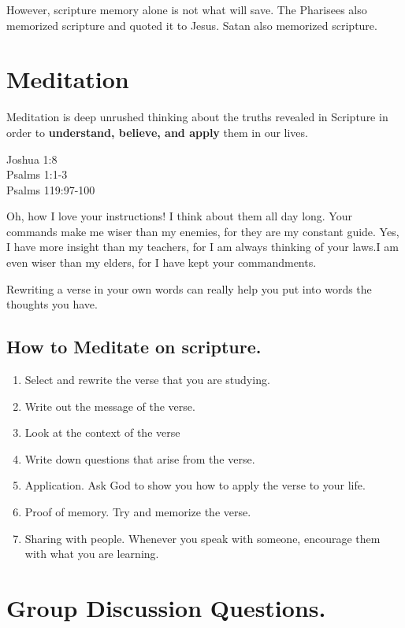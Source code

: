 \documentclass[
  letterpaper,
  DIV=11,
  numbers=noendperiod]{scrartcl}
\providecommand{\tightlist}{%
  \setlength{\itemsep}{0pt}\setlength{\parskip}{0pt}}
\begin{document}
However, scripture memory alone is not what will save. The Pharisees
also memorized scripture and quoted it to Jesus. Satan also memorized
scripture.


\chapter{Meditation}\label{meditation}

Meditation is deep unrushed thinking about the truths revealed in
Scripture in order to \textbf{understand, believe, and apply} them in
our lives.

Joshua 1:8\\
Psalms 1:1-3\\
Psalms 119:97-100

Oh, how I love your instructions! I think about them all day long. Your
commands make me wiser than my enemies, for they are my constant guide.
Yes, I have more insight than my teachers, for I am always thinking of
your laws.I am even wiser than my elders, for I have kept your
commandments.

Rewriting a verse in your own words can really help you put into words
the thoughts you have.

\section{How to Meditate on
scripture.}\label{how-to-meditate-on-scripture.}

\begin{enumerate}
\def\labelenumi{\arabic{enumi}.}
\tightlist
\item
  Select and rewrite the verse that you are studying.
\item
  Write out the message of the verse.
\item
  Look at the context of the verse
\item
  Write down questions that arise from the verse.
\item
  Application. Ask God to show you how to apply the verse to your life.
\item
  Proof of memory. Try and memorize the verse.
\item
  Sharing with people. Whenever you speak with someone, encourage them
  with what you are learning.
\end{enumerate}


\chapter{Group Discussion Questions.}\label{group-discussion-questions.}
\end{document}
